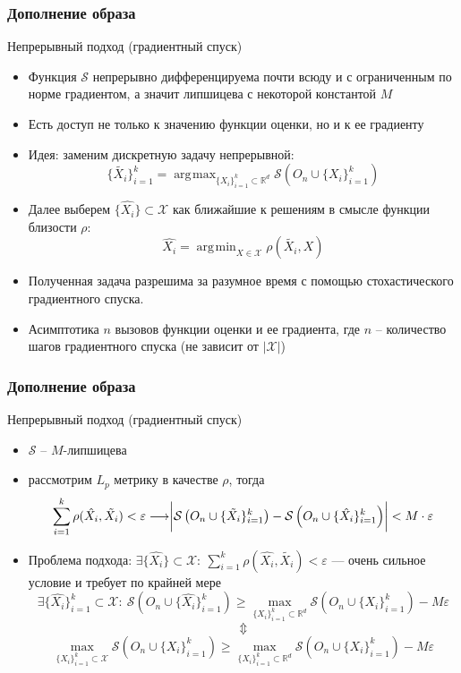 \documentclass[10pt]{beamer}
\DeclareMathOperator*{\argmax}{\arg\!\max}
\DeclareMathOperator*{\argmin}{\arg\!\min}
\begin{document}
\begin{frame}
	\frametitle{Дополнение образа}
	\begin{block}{Непрерывный подход (градиентный спуск)}
		\begin{itemize}
			\item Функция $\mathcal{S}$ непрерывно дифференцируема почти всюду и с ограниченным по норме градиентом, а значит липшицева с некоторой константой $M$
			\item Есть доступ не только к значению функции оценки, но и к ее градиенту 
			\item Идея: заменим дискретную задачу непрерывной:
			 	$$\{\tilde{X_i}\}_{i=1}^k= \argmax_{\{X_i\}_{i=1}^k\subset\mathbb{R}^d} \mathcal{S}\left(O_n\cup\{X_i\}_{i=1}^k\right)$$
	 \item Далее выберем $\{\hat{X_i}\}\subset\mathcal{X}$ как ближайшие к решениям  в смысле функции близости $\rho$:
	 \vspace{-0.3cm}
	 $$\hat{X_i} =  \argmin_{X\in\mathcal{X}} \rho(\tilde{X_i}, X)$$
	  \vspace{-0.5cm}
	 \item Полученная задача разрешима за разумное время с помощью стохастического градиентного спуска.
	 \item Асимптотика $n$ вызовов функции оценки и ее градиента, где $n$ -- количество шагов градиентного спуска (не зависит от $|\mathcal{X}|$)
		\end{itemize}
	\end{block}
\end{frame}


\begin{frame}
	\frametitle{Дополнение образа}
	\begin{block}{Непрерывный подход (градиентный спуск)}
		\begin{itemize}
			\item $\mathcal{S}$ -- $M$-липшицева
			\item рассмотрим $L_p$ метрику в качестве $\rho$, тогда
			$$\sum_{i=1}^k\rho(\hat{X_i}, \tilde{X_i}) < \varepsilon\longrightarrow \biggr{|}\mathcal{S}\left(O_n\cup\{\tilde{X_i}\}_{i=1}^k\right) - \mathcal{S}\left(O_n\cup\{\hat{X_i}\}_{i=1}^k\right)\biggr{|} < M\cdot\varepsilon$$
			
			\item Проблема подхода: $\exists\{\hat{X_i}\}\subset \mathcal{X}:~ \sum\limits_{i=1}^k\rho(\hat{X_i}, \tilde{X_i}) < \varepsilon$ --- очень сильное условие и требует по крайней мере
			$$\exists \{\hat{X_i}\}_{i=1}^k\subset\mathcal{X}:~ \mathcal{S}\left(O_n\cup\{\hat{X_i}\}_{i=1}^k\right) \geqslant \max_{\{X_i\}_{i=1}^k\subset\mathbb{R}^d} \mathcal{S}\left(O_n\cup\{X_i\}_{i=1}^k\right) - M\varepsilon$$
			$$\Updownarrow$$
			$$\max_{\{X_i\}_{i=1}^k\subset\mathcal{X}} \mathcal{S}\left(O_n\cup\{X_i\}_{i=1}^k\right) \geqslant \max_{\{X_i\}_{i=1}^k\subset\mathbb{R}^d} \mathcal{S}\left(O_n\cup\{X_i\}_{i=1}^k\right) - M\varepsilon$$
		\end{itemize}
	\end{block}
\end{frame}
\end{document}
